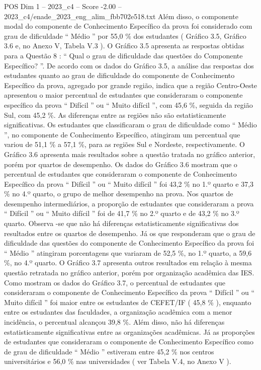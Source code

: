\begin{textsample}{POS Dim 1 – 2023\_c4 – Score -2.00 – 2023\_c4/enade\_2023\_eng\_alim\_fbb702e518.txt}
Além disso, o componente modal do componente de Conhecimento Específico da prova foi considerado com grau de dificuldade “ Médio ” por 55,0 \% dos estudantes ( Gráfico 3.5, Gráfico 3.6 e, no Anexo V, Tabela V.3 ).
O Gráfico 3.5 apresenta as respostas obtidas para a Questão 8 : “ Qual o grau de dificuldade das questões do Componente Específico? ”.
De acordo com os dados do Gráfico 3.5, a análise das respostas dos estudantes quanto ao grau de dificuldade do componente de Conhecimento Específico da prova, agregado por grande região, indica que a região Centro-Oeste apresentou o maior percentual de estudantes que consideraram o componente específico da prova “ Difícil ” ou “ Muito difícil ”, com 45,6 \%, seguida da região Sul, com 45,2 \%.
As diferenças entre as regiões não são estatisticamente significativas.
Os estudantes que classificaram o grau de dificuldade como “ Médio ”, no componente de Conhecimento Específico, atingiram um percentual que variou de 51,1 \% a 57,1 \%, para as regiões Sul e Nordeste, respectivamente.
O Gráfico 3.6 apresenta mais resultados sobre a questão tratada no gráfico anterior, porém por quartos de desempenho.
Os dados do Gráfico 3.6 mostram que o percentual de estudantes que consideraram o componente de Conhecimento Específico da prova “ Difícil ” ou “ Muito difícil ” foi 43,2 \% no 1.º quarto e 37,3 \% no 4.º quarto, o grupo de melhor desempenho na prova.
Nos quartos de desempenho intermediários, a proporção de estudantes que consideraram a prova “ Difícil ” ou “ Muito difícil ” foi de 41,7 \% no 2.º quarto e de 43,2 \% no 3.º quarto.
Observa -se que não há diferenças estatisticamente significativas dos resultados entre os quartos de desempenho.
Já os que responderam que o grau de dificuldade das questões do componente de Conhecimento Específico da prova foi “ Médio ” atingiram porcentagens que variaram de 52,5 \%, no 1.º quarto, a 59,6 \%, no 4.º quarto.
O Gráfico 3.7 apresenta outros resultados em relação à mesma questão retratada no gráfico anterior, porém por organização acadêmica das IES.
Como mostram os dados do Gráfico 3.7, o percentual de estudantes que consideraram o componente de Conhecimento Específico da prova “ Difícil ” ou “ Muito difícil ” foi maior entre os estudantes de CEFET/IF ( 45,8 \% ), enquanto entre os estudantes das faculdades, a organização acadêmica com a menor incidência, o percentual alcançou 39,8 \%.
Além disso, não há diferenças estatisticamente significativas entre as organizações acadêmicas.
Já as proporções de estudantes que consideraram o componente de Conhecimento Específico como de grau de dificuldade “ Médio ” estiveram entre 45,2 \% nos centros universitários e 56,0 \% nas universidades ( ver Tabela V.4, no Anexo V ).

\end{textsample}
